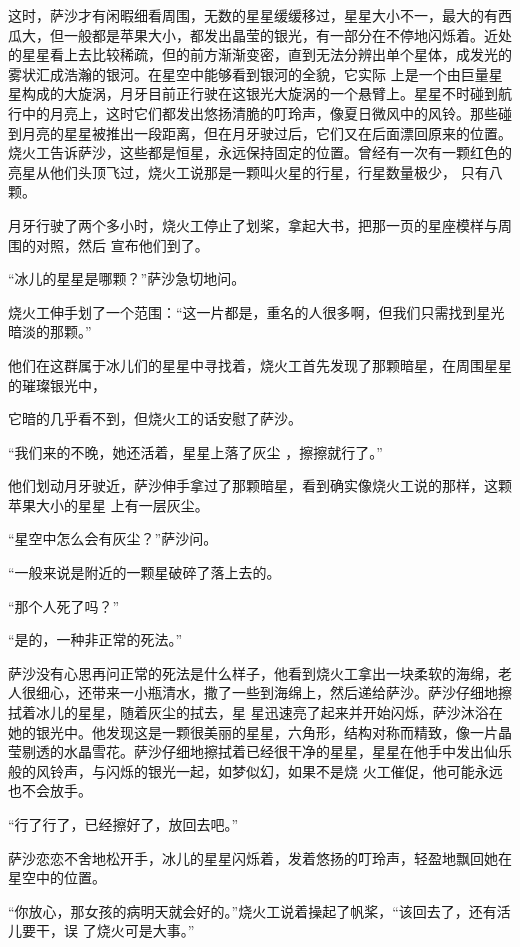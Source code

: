 \documentclass{article}
\begin{document}
这时，萨沙才有闲暇细看周围，无数的星星缓缓移过，星星大小不一，最大的有西瓜大，但一般都是苹果大小，都发出晶莹的银光，有一部分在不停地闪烁着。近处的星星看上去比较稀疏，但的前方渐渐变密，直到无法分辨出单个星体，成发光的雾状汇成浩瀚的银河。在星空中能够看到银河的全貌，它实际
\newpage
上是一个由巨量星星构成的大旋涡，月牙目前正行驶在这银光大旋涡的一个悬臂上。星星不时碰到航行中的月亮上，这时它们都发出悠扬清脆的叮玲声，像夏日微风中的风铃。那些碰到月亮的星星被推出一段距离，但在月牙驶过后，它们又在后面漂回原来的位置。烧火工告诉萨沙，这些都是恒星，永远保持固定的位置。曾经有一次有一颗红色的亮星从他们头顶飞过，烧火工说那是一颗叫火星的行星，行星数量极少，
只有八颗。 

月牙行驶了两个多小时，烧火工停止了划桨，拿起大书，把那一页的星座模样与周围的对照，然后
宣布他们到了。 


“冰儿的星星是哪颗？”萨沙急切地问。 

烧火工伸手划了一个范围：“这一片都是，重名的人很多啊，但我们只需找到星光暗淡的那颗。”

他们在这群属于冰儿们的星星中寻找着，烧火工首先发现了那颗暗星，在周围星星的璀璨银光中，
\newpage

它暗的几乎看不到，但烧火工的话安慰了萨沙。 

“我们来的不晚，她还活着，星星上落了灰尘
，擦擦就行了。” 

他们划动月牙驶近，萨沙伸手拿过了那颗暗星，看到确实像烧火工说的那样，这颗苹果大小的星星
上有一层灰尘。 


“星空中怎么会有灰尘？”萨沙问。 

“一般来说是附近的一颗星破碎了落上去的。


“那个人死了吗？” 


“是的，一种非正常的死法。” 

萨沙没有心思再问正常的死法是什么样子，他看到烧火工拿出一块柔软的海绵，老人很细心，还带来一小瓶清水，撒了一些到海绵上，然后递给萨沙。萨沙仔细地擦拭着冰儿的星星，随着灰尘的拭去，星
\newpage
星迅速亮了起来并开始闪烁，萨沙沐浴在她的银光中。他发现这是一颗很美丽的星星，六角形，结构对称而精致，像一片晶莹剔透的水晶雪花。萨沙仔细地擦拭着已经很干净的星星，星星在他手中发出仙乐般的风铃声，与闪烁的银光一起，如梦似幻，如果不是烧
火工催促，他可能永远也不会放手。 


“行了行了，已经擦好了，放回去吧。” 

萨沙恋恋不舍地松开手，冰儿的星星闪烁着，发着悠扬的叮玲声，轻盈地飘回她在星空中的位置。

“你放心，那女孩的病明天就会好的。”烧火工说着操起了帆桨，“该回去了，还有活儿要干，误
了烧火可是大事。” 
\end{document}
